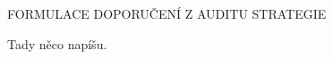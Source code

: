 \begin{lefttextpipe}
	{\Large \MakeUppercase{} FORMULACE DOPORUČENÍ Z AUDITU STRATEGIE}
\end{lefttextpipe}

Tady něco napíšu.